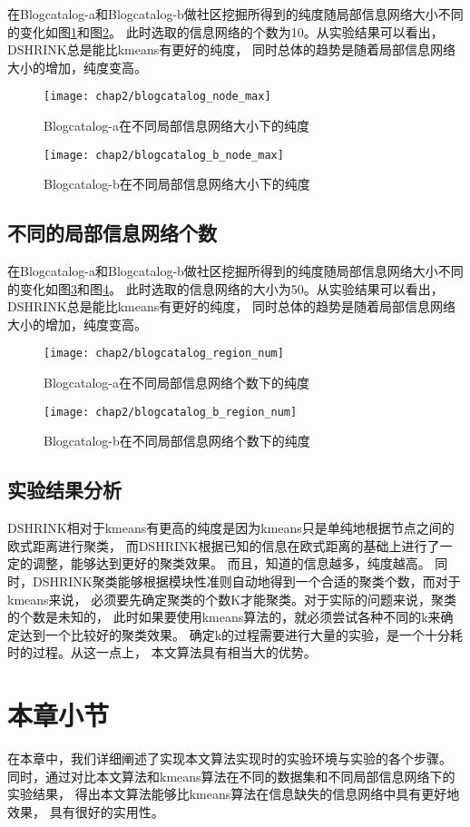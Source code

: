 在Blogcatalog-a和Blogcatalog-b做社区挖掘所得到的纯度随局部信息网络大小不同的变化如图\ref{fig:node_max:a}和图\ref{fig:node_max:b}。
此时选取的信息网络的个数为10。从实验结果可以看出，DSHRINK总是能比kmeans有更好的纯度，
同时总体的趋势是随着局部信息网络大小的增加，纯度变高。

\begin{figure}
    \texttt{[image: chap2/blogcatalog\_node\_max]}
    \caption{Blogcatalog-a在不同局部信息网络大小下的纯度}
    \label{fig:node_max:a}
\end{figure}

\begin{figure}
    \texttt{[image: chap2/blogcatalog\_b\_node\_max]}
    \caption{Blogcatalog-b在不同局部信息网络大小下的纯度}
    \label{fig:node_max:b}
\end{figure}

\subsection{不同的局部信息网络个数}
\label{sec:results_region_num}

在Blogcatalog-a和Blogcatalog-b做社区挖掘所得到的纯度随局部信息网络大小不同的变化如图\ref{fig:region_num:a}和图\ref{fig:region_num:b}。
此时选取的信息网络的大小为50。从实验结果可以看出，DSHRINK总是能比kmeans有更好的纯度，
同时总体的趋势是随着局部信息网络大小的增加，纯度变高。

\begin{figure}
    \texttt{[image: chap2/blogcatalog\_region\_num]}
    \caption{Blogcatalog-a在不同局部信息网络个数下的纯度}
    \label{fig:region_num:a}
\end{figure}

\begin{figure}
    \texttt{[image: chap2/blogcatalog\_b\_region\_num]}
    \caption{Blogcatalog-b在不同局部信息网络个数下的纯度}
    \label{fig:region_num:b}
\end{figure}

\subsection{实验结果分析}

DSHRINK相对于kmeans有更高的纯度是因为kmeans只是单纯地根据节点之间的欧式距离进行聚类，
而DSHRINK根据已知的信息在欧式距离的基础上进行了一定的调整，能够达到更好的聚类效果。
而且，知道的信息越多，纯度越高。
同时，DSHRINK聚类能够根据模块性准则自动地得到一个合适的聚类个数，而对于kmeans来说，
必须要先确定聚类的个数K才能聚类。对于实际的问题来说，聚类的个数是未知的，
此时如果要使用kmeans算法的，就必须尝试各种不同的k来确定达到一个比较好的聚类效果。
确定k的过程需要进行大量的实验，是一个十分耗时的过程。从这一点上，
本文算法具有相当大的优势。


\section{本章小节}

在本章中，我们详细阐述了实现本文算法实现时的实验环境与实验的各个步骤。
同时，通过对比本文算法和kmeans算法在不同的数据集和不同局部信息网络下的实验结果，
得出本文算法能够比kmeans算法在信息缺失的信息网络中具有更好地效果，
具有很好的实用性。
